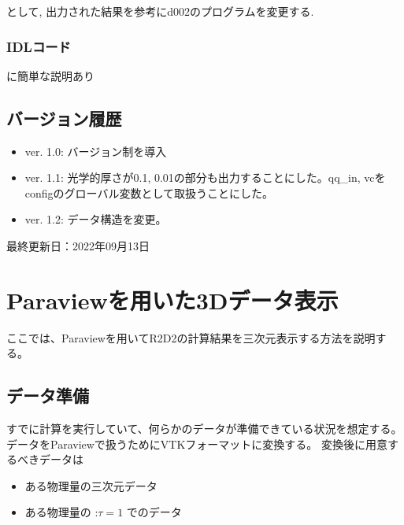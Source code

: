 \documentclass[letterpaper,10pt,dvipdfmx,report]{sphinxmanual}
\begin{document}
\sphinxAtStartPar
として, 出力された結果を参考にd002のプログラムを変更する.


\subsection{IDLコード}
\label{\detokenize{io:idl}}
\sphinxAtStartPar
{} に簡単な説明あり


\section{バージョン履歴}
\label{\detokenize{io:id8}}\begin{itemize}
\item {} 
\sphinxAtStartPar
ver. 1.0: バージョン制を導入

\item {} 
\sphinxAtStartPar
ver. 1.1: 光学的厚さが0.1, 0.01の部分も出力することにした。qq\_in, vcをconfigのグローバル変数として取扱うことにした。

\item {} 
\sphinxAtStartPar
ver. 1.2: データ構造を変更。

\end{itemize}

\sphinxAtStartPar
最終更新日：2022年09月13日

\sphinxstepscope


\chapter{Paraviewを用いた3Dデータ表示}
\label{\detokenize{paraview:paraview3d}}\label{\detokenize{paraview::doc}}
\sphinxAtStartPar
ここでは、Paraviewを用いてR2D2の計算結果を三次元表示する方法を説明する。


\section{データ準備}
\label{\detokenize{paraview:id1}}
\sphinxAtStartPar
すでに計算を実行していて、何らかのデータが準備できている状況を想定する。
データをParaviewで扱うためにVTKフォーマットに変換する。
変換後に用意するべきデータは
\begin{itemize}
\item {} 
\sphinxAtStartPar
ある物理量の三次元データ

\item {} 
\sphinxAtStartPar
ある物理量の :\(\tau=1\) でのデータ

\end{itemize}
\end{document}
